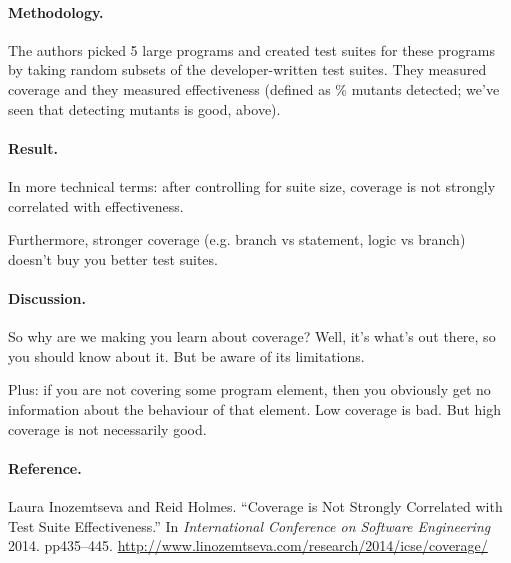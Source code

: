 \documentclass[11pt]{article}
\begin{document}
\paragraph{Methodology.} The authors picked 5 large programs
and created test suites for these programs by taking random
subsets of the developer-written test suites. They measured
coverage and they measured effectiveness (defined as \% mutants
detected; we've seen that detecting mutants is good, above).

\paragraph{Result.} In more technical terms: after controlling
for suite size, coverage is not strongly correlated with effectiveness.

Furthermore, stronger coverage (e.g. branch vs statement, logic vs branch)
doesn't buy you better test suites.

\paragraph{Discussion.} So why are we making you learn about
coverage? Well, it's what's out there, so you should know about it.
But be aware of its limitations.

Plus: if you are not covering some program element, then you obviously
get no information about the behaviour of that element. Low coverage
is bad. But high coverage is not necessarily good.

\paragraph{Reference.} Laura Inozemtseva and Reid Holmes.
``Coverage is Not Strongly Correlated with Test Suite Effectiveness.''
In {\em International Conference on Software Engineering} 2014. pp435--445.
\url{http://www.linozemtseva.com/research/2014/icse/coverage/}
\end{document}
